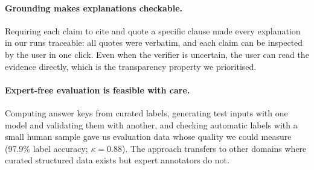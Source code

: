 \paragraph{Grounding makes explanations checkable.}
Requiring each claim to cite and quote a specific clause made every explanation in our runs traceable: all quotes were verbatim, and each claim can be inspected by the user in one click. Even when the verifier is uncertain, the user can read the evidence directly, which is the transparency property we prioritised.

\paragraph{Expert-free evaluation is feasible with care.}
Computing answer keys from curated labels, generating test inputs with one model and validating them with another, and checking automatic labels with a small human sample gave us evaluation data whose quality we could measure (97.9\% label accuracy; $\kappa = 0.88$). The approach transfers to other domains where curated structured data exists but expert annotators do not.
